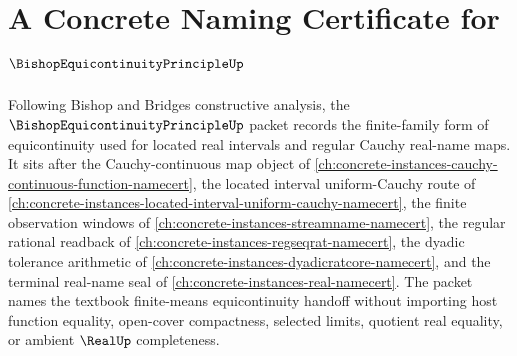 \chapter{A Concrete Naming Certificate for $\BishopEquicontinuityPrincipleUp$}
\label{ch:concrete-instances-bishop-equicontinuity-principle-namecert}

Following Bishop and Bridges constructive analysis, the $\BishopEquicontinuityPrincipleUp$ packet records the finite-family form of equicontinuity used for located real intervals and regular Cauchy real-name maps. It sits after the Cauchy-continuous map object of \autoref{ch:concrete-instances-cauchy-continuous-function-namecert}, the located interval uniform-Cauchy route of \autoref{ch:concrete-instances-located-interval-uniform-cauchy-namecert}, the finite observation windows of \autoref{ch:concrete-instances-streamname-namecert}, the regular rational readback of \autoref{ch:concrete-instances-regseqrat-namecert}, the dyadic tolerance arithmetic of \autoref{ch:concrete-instances-dyadicratcore-namecert}, and the terminal real-name seal of \autoref{ch:concrete-instances-real-namecert}. The packet names the textbook finite-means equicontinuity handoff without importing host function equality, open-cover compactness, selected limits, quotient real equality, or ambient $\RealUp$ completeness.

